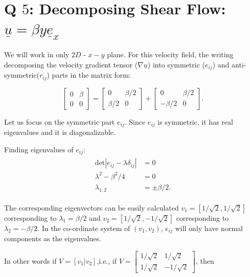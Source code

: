\documentclass{article}
\begin{document}
\section{Q $5$: Decomposing Shear Flow: $\underline{u}=\beta y \underline{e}_{x}$}
We will work in only $2D$ - $x-y$ plane. For this velocity field, the writing decomposing the velocity gradient tensor ($\nabla \underline{u}$) into symmetric ($e_{ij}$) and anti-symmetric($r_{ij}$) parts in the matrix form:

\begin{equation}\label{eq:gradu_decomp}
 \begin{bmatrix}
  0 & \beta \\
  0 & 0
 \end{bmatrix}
= \begin{bmatrix}
  0 & \beta/2 \\
  \beta/2 & 0
 \end{bmatrix}
 + \begin{bmatrix}
  0 & \beta/2 \\
  -\beta/2 & 0
 \end{bmatrix}.
\end{equation}

Let us focus on the symmetric part $e_{ij}$. Since $e_{ij}$ is symmetric, it has real eigenvalues and it is diagonalizable. 

Finding eigenvalues of $e_{ij}$:
\begin{align}\label{eq:eij_eig}
 \begin{split}
  \textrm{det}|e_{ij} - \lambda \delta_{ij}| &= 0\\
  \lambda^{2} - \beta^{2}/4 &= 0\\
  \lambda_{1, 2} &= \pm \beta/2.
\end{split}
\end{align}

The corresponding eigenvectors can be easily calculated $v_{1} = [1/\sqrt{2},1/\sqrt{2}]$ corresponding to $\lambda_{1} = \beta/2$ and $v_{2} = [1/\sqrt{2},-1/\sqrt{2}]$ corresponding to $\lambda_{2} = -\beta/2$. In the co-ordinate system of $(v_{1}, v_{2})$, $e_{ij}$ will only have normal components as the eigenvalues. 

In other words if $V = [v_{1} | v_{2}]$,i.e., if $V = \begin{bmatrix}
  1/\sqrt{2} & 1/\sqrt{2} \\
  1/\sqrt{2} & -1/\sqrt{2}                                                         \end{bmatrix}
$, then 
\end{document}
